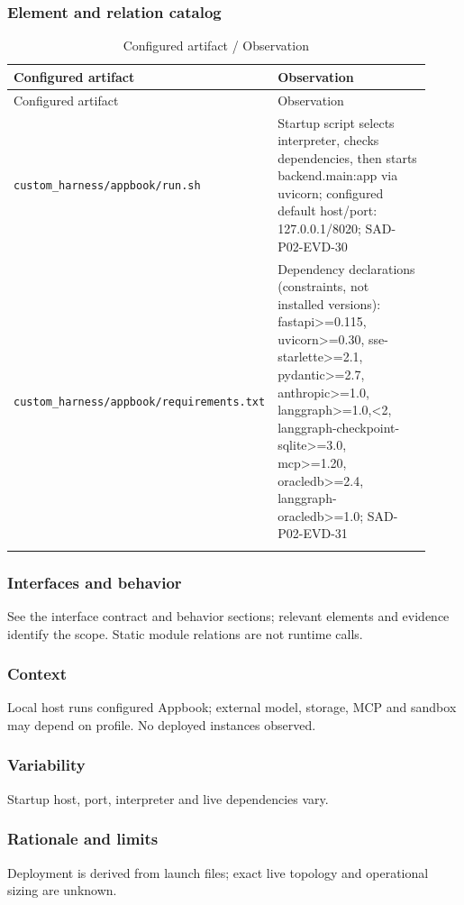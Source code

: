 \documentclass[10pt,letterpaper]{article}
\begin{document}
\subsubsection{Element and relation catalog}
\begin{longtable}{@{}>{\raggedright\arraybackslash}p{0.38\linewidth}>{\raggedright\arraybackslash}p{0.54\linewidth}@{}}
\caption{Configured artifact / Observation}\\
\toprule Configured artifact & Observation\\\midrule\endfirsthead
\toprule Configured artifact & Observation\\\midrule\endhead
\nolinkurl{custom_harness/appbook/run.sh} & Startup script selects interpreter, checks dependencies, then starts backend.main:app via uvicorn; configured default host/port: 127.0.0.1/8020; SAD-P02-EVD-30\\\addlinespace
\nolinkurl{custom_harness/appbook/requirements.txt} & Dependency declarations (constraints, not installed versions): fastapi>=0.115, uvicorn>=0.30, sse-starlette>=2.1, pydantic>=2.7, anthropic>=1.0, langgraph>=1.0,<2, langgraph-checkpoint-sqlite>=3.0, mcp>=1.20, oracledb>=2.4, langgraph-oracledb>=1.0; SAD-P02-EVD-31\\\addlinespace
\bottomrule\end{longtable}

\subsubsection{Interfaces and behavior}
See the interface contract and behavior sections; relevant elements and evidence identify the scope. Static module relations are not runtime calls.
\subsubsection{Context}
Local host runs configured Appbook; external model, storage, MCP and sandbox may depend on profile. No deployed instances observed.
\subsubsection{Variability}
Startup host, port, interpreter and live dependencies vary.
\subsubsection{Rationale and limits}
Deployment is derived from launch files; exact live topology and operational sizing are unknown.
\end{document}
